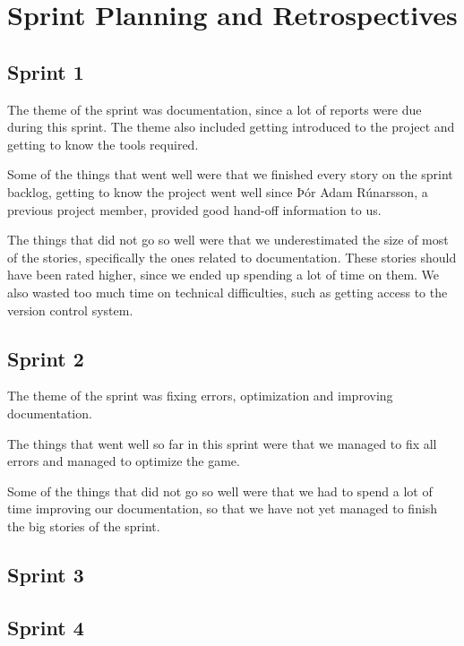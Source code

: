 \section{Sprint Planning and Retrospectives}\label{sec:retrospectives}

\subsection{Sprint 1}
The theme of the sprint was documentation, since a lot of reports were due during this sprint. The theme also included getting introduced to the project and getting to know the tools required.


Some of the things that went well were that we finished every story on the sprint backlog, getting to know the project went well since Þór Adam Rúnarsson, a previous project member, provided good hand-off information to us.


The things that did not go so well were that we underestimated the size of most of the stories, specifically the ones related to documentation. These stories should have been rated higher, since we ended up spending a lot of time on them. We also wasted too much time on technical difficulties, such as getting access to the version control system. 

\subsection{Sprint 2}
The theme of the sprint was fixing errors, optimization and improving documentation.

The things that went well so far in this sprint were that we managed to fix all errors and managed to optimize the game. 

Some of the things that did not go so well were that we had to spend a lot of time improving our documentation, so that we have not yet managed to finish the big stories of the sprint.

\subsection{Sprint 3}

\subsection{Sprint 4}